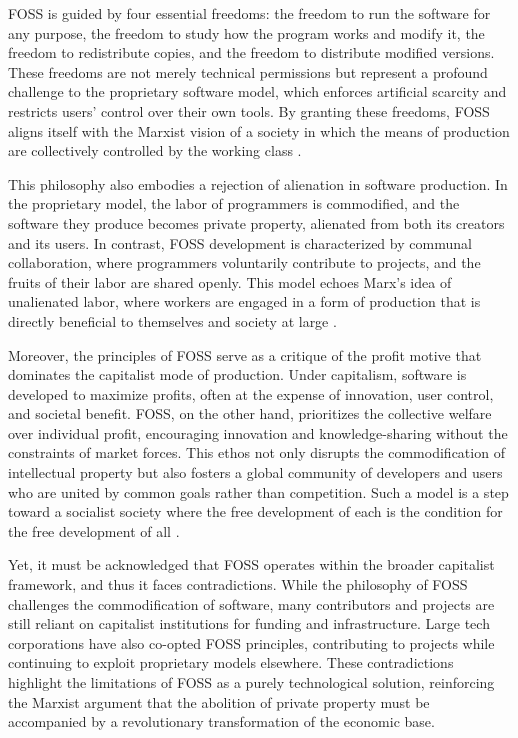 \begin{refsection}
FOSS is guided by four essential freedoms: the freedom to run the software for any purpose, the freedom to study how the program works and modify it, the freedom to redistribute copies, and the freedom to distribute modified versions. These freedoms are not merely technical permissions but represent a profound challenge to the proprietary software model, which enforces artificial scarcity and restricts users' control over their own tools. By granting these freedoms, FOSS aligns itself with the Marxist vision of a society in which the means of production are collectively controlled by the working class \cite[pp.~45-46]{stallman2002}.

This philosophy also embodies a rejection of alienation in software production. In the proprietary model, the labor of programmers is commodified, and the software they produce becomes private property, alienated from both its creators and its users. In contrast, FOSS development is characterized by communal collaboration, where programmers voluntarily contribute to projects, and the fruits of their labor are shared openly. This model echoes Marx’s idea of unalienated labor, where workers are engaged in a form of production that is directly beneficial to themselves and society at large \cite[pp.~78-79]{marx1844}.

Moreover, the principles of FOSS serve as a critique of the profit motive that dominates the capitalist mode of production. Under capitalism, software is developed to maximize profits, often at the expense of innovation, user control, and societal benefit. FOSS, on the other hand, prioritizes the collective welfare over individual profit, encouraging innovation and knowledge-sharing without the constraints of market forces. This ethos not only disrupts the commodification of intellectual property but also fosters a global community of developers and users who are united by common goals rather than competition. Such a model is a step toward a socialist society where the free development of each is the condition for the free development of all \cite[pp.~66-68]{marx1848}.

Yet, it must be acknowledged that FOSS operates within the broader capitalist framework, and thus it faces contradictions. While the philosophy of FOSS challenges the commodification of software, many contributors and projects are still reliant on capitalist institutions for funding and infrastructure. Large tech corporations have also co-opted FOSS principles, contributing to projects while continuing to exploit proprietary models elsewhere. These contradictions highlight the limitations of FOSS as a purely technological solution, reinforcing the Marxist argument that the abolition of private property must be accompanied by a revolutionary transformation of the economic base.


\end{refsection}
